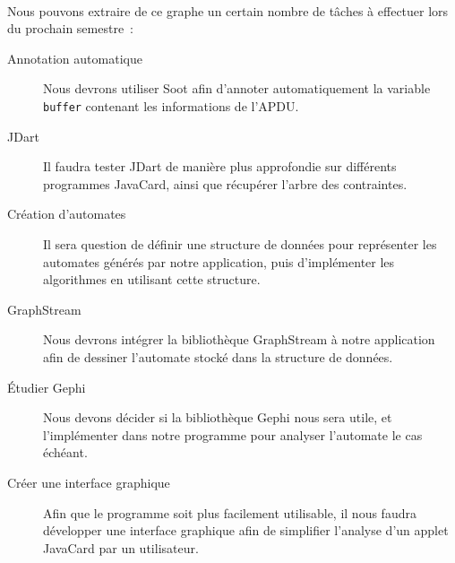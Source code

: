 \paragraph{}
Nous pouvons extraire de ce graphe un certain nombre de tâches à
effectuer lors du prochain semestre~:

\begin{description}
\item[Annotation automatique] Nous devrons utiliser Soot afin
  d'annoter automatiquement la variable \verb|buffer| contenant les
  informations de l'\gls{APDU}.
\item[JDart] Il faudra tester JDart de manière plus approfondie sur
  différents programmes JavaCard, ainsi que récupérer l'arbre des
  contraintes.
\item[Création d'automates] Il sera question de définir une structure
  de données pour représenter les automates générés par notre
  application, puis d'implémenter les algorithmes en utilisant cette
  structure.
\item[GraphStream] Nous devrons intégrer la bibliothèque GraphStream à
  notre application afin de dessiner l'automate stocké dans la
  structure de données.
\item[Étudier Gephi] Nous devons décider si la bibliothèque Gephi nous
  sera utile, et l'implémenter dans notre programme pour analyser
  l'automate le cas échéant.
\item[Créer une interface graphique] Afin que le programme soit plus
  facilement utilisable, il nous faudra développer une interface
  graphique afin de simplifier l'analyse d'un applet JavaCard par un
  utilisateur.
\end{description}

